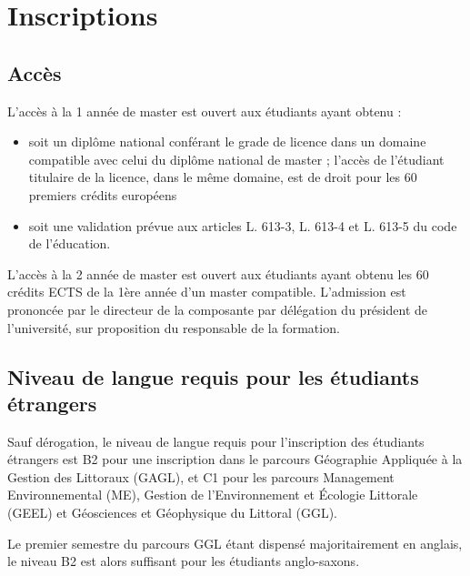\documentclass[a4paper,11pt]{article}
\begin{document}

\section{Inscriptions}\label{Inscriptions}
\subsection{Accès}\label{Acces}
\setcounter{page}{1}

L'accès à la 1\iere{} année de master est ouvert aux étudiants ayant obtenu :
\begin{itemize} 
\item soit un diplôme national conférant le grade de licence dans un domaine compatible avec celui du diplôme national de master ; l'accès de l'étudiant titulaire de la licence, dans le même domaine, est de droit pour les 60 premiers crédits européens
\item soit une validation prévue aux articles L. 613-3, L. 613-4 et L. 613-5 du code de l'éducation.
\end{itemize}

L'accès à la 2\ieme{} année de master est ouvert aux étudiants ayant obtenu les 60 crédits ECTS de la 1ère année d'un master compatible. L'admission est prononcée par le directeur de la composante par délégation du président de l'université, sur proposition du responsable de la formation.


\subsection{Niveau de langue requis pour les étudiants étrangers}\label{langue}
Sauf dérogation, le niveau de langue requis pour l'inscription des étudiants étrangers est B2 pour une inscription dans le parcours Géographie Appliquée à la Gestion des Littoraux (GAGL), et C1 pour les parcours Management Environnemental (ME), Gestion de l'Environnement et Écologie Littorale (GEEL) et Géosciences et Géophysique du Littoral (GGL).

Le premier semestre du parcours GGL étant dispensé majoritairement en anglais, le niveau B2 est alors suffisant pour les étudiants anglo-saxons.
\end{document}
